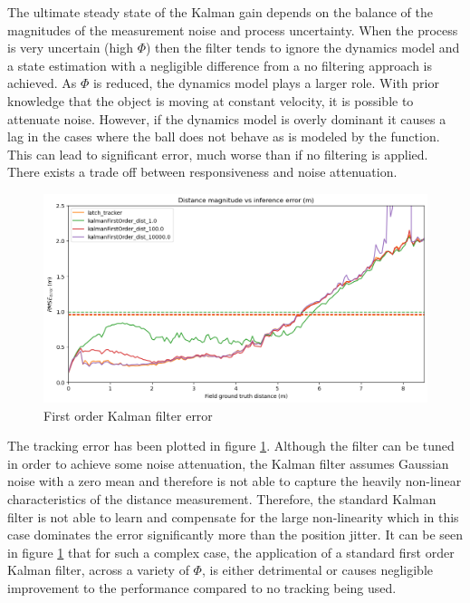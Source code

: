 \documentclass[a4paper,twoside,12pt]{report}
\begin{document}
The ultimate steady state of the Kalman gain depends on the balance of the magnitudes of the measurement noise and process uncertainty. When the process is very uncertain (high $\Phi$) then the filter tends to ignore the dynamics model and a state estimation with a negligible difference from a no filtering approach is achieved. As $\Phi$ is reduced, the dynamics model plays a larger role. With prior knowledge that the object is moving at constant velocity, it is possible to attenuate noise. However, if the dynamics model is overly dominant it causes a lag in the cases where the ball does not behave as is modeled by the function. This can lead to significant error, much worse than if no filtering is applied. There exists a trade off between responsiveness and noise attenuation.

\begin{figure}[h!]
\begin{center}
\includegraphics[width=14cm]{images/fok_error.png}
\caption{First order Kalman filter error}
\label{fig:fokerror}
\end{center}
\end{figure}

The tracking error has been plotted in figure \ref{fig:fokerror}. Although the filter can be tuned in order to achieve some noise attenuation, the Kalman filter assumes Gaussian noise with a zero mean and therefore is not able to capture the heavily non-linear characteristics of the distance measurement. Therefore, the standard Kalman filter is not able to learn and compensate for the large non-linearity which in this case dominates the error significantly more than the position jitter. It can be seen in figure \ref{fig:fokerror} that for such a complex case, the application of a standard first order Kalman filter, across a variety of $\Phi$, is either detrimental or causes negligible improvement to the performance compared to no tracking being used.
\end{document}
